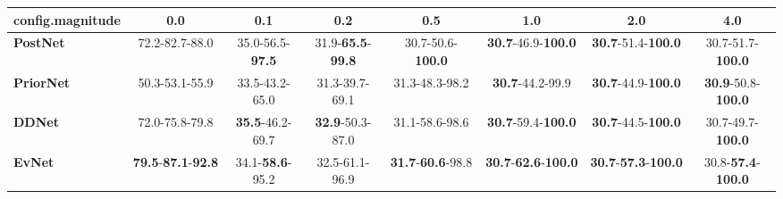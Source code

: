 \begin{tabular}{lccccccc}
\toprule
\textbf{config.magnitude} &                                        0.0 &                      0.1 &                               0.2 &                               0.5 &                                         1.0 &                                         2.0 &                                4.0 \\
\midrule
\textbf{PostNet } &                             72.2-82.7-88.0 &  35.0-56.5-\textbf{97.5} &  31.9-\textbf{65.5}-\textbf{99.8} &          30.7-50.6-\textbf{100.0} &           \textbf{30.7}-46.9-\textbf{100.0} &           \textbf{30.7}-51.4-\textbf{100.0} &           30.7-51.7-\textbf{100.0} \\
\textbf{PriorNet} &                             50.3-53.1-55.9 &           33.5-43.2-65.0 &                    31.3-39.7-69.1 &                    31.3-48.3-98.2 &                     \textbf{30.7}-44.2-99.9 &           \textbf{30.7}-44.9-\textbf{100.0} &  \textbf{30.9}-50.8-\textbf{100.0} \\
\textbf{DDNet   } &                             72.0-75.8-79.8 &  \textbf{35.5}-46.2-69.7 &           \textbf{32.9}-50.3-87.0 &                    31.1-58.6-98.6 &           \textbf{30.7}-59.4-\textbf{100.0} &           \textbf{30.7}-44.5-\textbf{100.0} &           30.7-49.7-\textbf{100.0} \\
\textbf{EvNet   } &  \textbf{79.5}-\textbf{87.1}-\textbf{92.8} &  34.1-\textbf{58.6}-95.2 &                    32.5-61.1-96.9 &  \textbf{31.7}-\textbf{60.6}-98.8 &  \textbf{30.7}-\textbf{62.6}-\textbf{100.0} &  \textbf{30.7}-\textbf{57.3}-\textbf{100.0} &  30.8-\textbf{57.4}-\textbf{100.0} \\
\bottomrule
\end{tabular}
